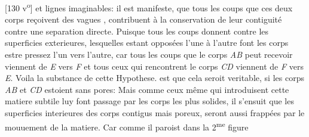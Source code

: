 [130 v\textsuperscript{o}] et lignes imaginables: il est manifeste, que tous les coups que ces deux corps\protect{} re\c{c}oivent des vagues , contribuent \`{a} la conservation de leur contiguit\'{e} contre une separation directe. Puisque tous les coups donnent contre les superficies exterieures, lesquelles estant oppos\'{e}es l'une \`{a} l'autre font les corps\protect{} estre pressez l'un vers l'autre, car tous les coups que le corps\protect{} \textit{AB} peut recevoir viennent de \textit{E} vers \textit{F} et tous ceux qui rencontrent le corps\protect{} \textit{CD} viennent de \textit{F} vers \textit{E}.\pend 
\clearpage
                        \pstart Voila la substance de cette Hypothese.  est que cela seroit veritable, si les corps\protect{} \textit{AB} et \textit{CD} estoient sans pores: Mais comme ceux même qui introduisent cette matiere subtile\protect{} luy font passage par les corps\protect{} les plus solides, il s'ensuit que les superficies interieures des corps\protect{} contigus mais poreux, seront aussi frapp\'{e}es par le mouuement de la matiere. Car comme il paroist dans la 2\textsuperscript{me} figure
